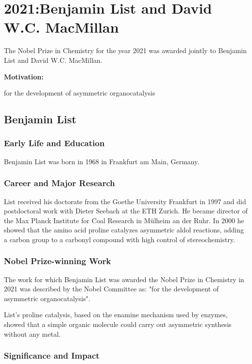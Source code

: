 \chapter{2021:Benjamin List and David W.C. MacMillan}

\label{chap:chemistry2021}

The Nobel Prize in Chemistry for the year 2021 was awarded jointly to Benjamin List and David W.C. MacMillan.

\textbf{Motivation:}

for the development of asymmetric organocatalysis

\section{Benjamin List}

\subsection*{Early Life and Education}

Benjamin List was born in 1968 in Frankfurt am Main, Germany.

\subsection*{Career and Major Research}

List received his doctorate from the Goethe University Frankfurt in 1997 and did postdoctoral work with Dieter Seebach at the ETH Zurich. He became director of the Max Planck Institute for Coal Research in Mülheim an der Ruhr. In 2000 he showed that the amino acid proline catalyzes asymmetric aldol reactions, adding a carbon group to a carbonyl compound with high control of stereochemistry.

\subsection*{Nobel Prize-winning Work}

The work for which Benjamin List was awarded the Nobel Prize in Chemistry in 2021 was described by the Nobel Committee as: "for the development of asymmetric organocatalysis".

List's proline catalysis, based on the enamine mechanism used by enzymes, showed that a simple organic molecule could carry out asymmetric synthesis without any metal.

\subsection*{Significance and Impact}

